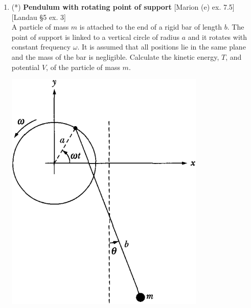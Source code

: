 \documentclass[11pt, a4paper, twoside]{article}
\begin{document}
\begin{enumerate}
\item
	\begin{minipage}[t][7.1cm]{0.5\textwidth}
		(*) \textbf{Pendulum with rotating point of support} [Marion (e) ex. 7.5] [Landau \S5 ex. 3]\\
		A particle of mass $m$ is attached to the end of a rigid bar of length $b$. The point of support is linked to a vertical circle of radius $a$ and it rotates with constant frequency $\omega$. It is assumed that all positions lie in the same plane and the mass of the bar is negligible. Calculate the kinetic energy, $T$, and potential $V$, of the particle of mass $m$.
	\end{minipage}
	\begin{minipage}[c][3cm][t]{0.5\textwidth}
		\includegraphics[width=0.75\textwidth]{figures/marion_fig7_3.png}
	\end{minipage}




\end{enumerate}
\end{document}

